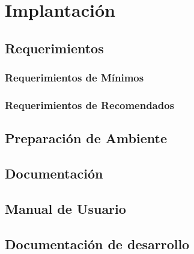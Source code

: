 \section{Implantación}
\label{sc:Impl}

\subsection{Requerimientos }

\subsubsection{Requerimientos de Mínimos}

\subsubsection{Requerimientos de Recomendados}

\subsection{Preparación de Ambiente} 


\subsection{Documentación}

\subsection{Manual de Usuario}

\subsection{Documentación de desarrollo} 

